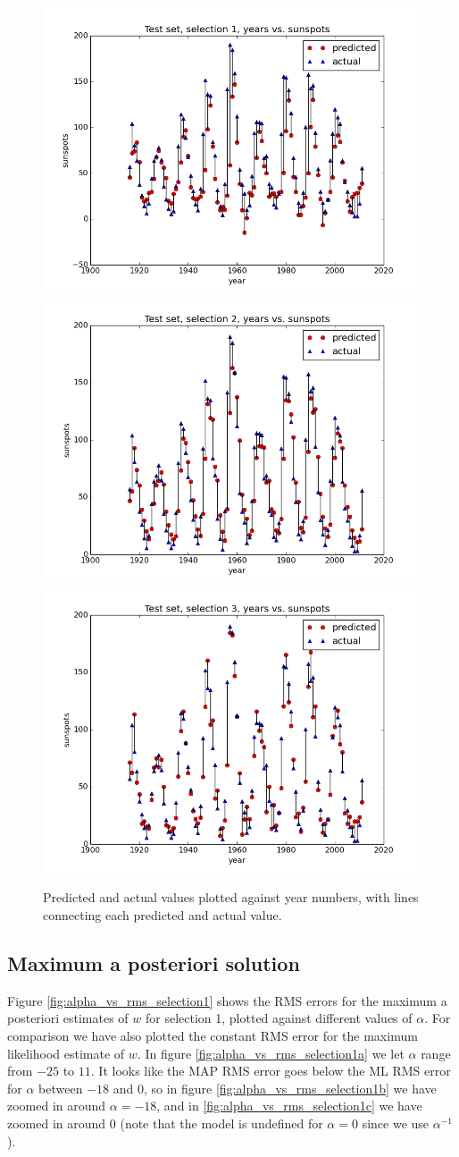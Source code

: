 \documentclass[a4paper]{article}
\begin{document}
\begin{figure}[H]
  \begin{adjustwidth}{-7em}{-7em}
    \centering
    \includegraphics[width=.32\linewidth]{figures/years_vs_sunspots_selection1.png}
    \includegraphics[width=.32\linewidth]{figures/years_vs_sunspots_selection2.png}
    \includegraphics[width=.32\linewidth]{figures/years_vs_sunspots_selection3.png}
  \end{adjustwidth}
  \caption{Predicted and actual values plotted against year numbers, with lines connecting each predicted and actual value.}
  \label{fig:years_vs_sunspots}
\end{figure}

\subsection{Maximum a posteriori solution}
Figure \ref{fig:alpha_vs_rms_selection1} shows the RMS errors for the maximum a posteriori estimates of $w$ for selection 1, plotted against different values of $\alpha$. For comparison we have also plotted the constant RMS error for the maximum likelihood estimate of $w$. In figure \ref{fig:alpha_vs_rms_selection1a} we let $\alpha$ range from $-25$ to $11$. It looks like the MAP RMS error goes below the ML RMS error for $\alpha$ between $-18$ and $0$, so in figure \ref{fig:alpha_vs_rms_selection1b} we have zoomed in around $\alpha = -18$, and in \ref{fig:alpha_vs_rms_selection1c} we have zoomed in around 0 (note that the model is undefined for $\alpha = 0$ since we use $\alpha^{-1}$).
\end{document}
